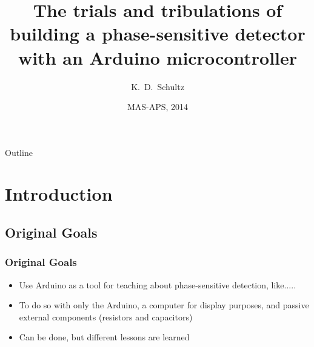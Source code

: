 \documentclass{beamer}
\title[PSD with Arduino CC-BY-SA.4.0] %
{The trials and tribulations of building a phase-sensitive detector with an Arduino microcontroller}
\author[K.\ D.\ Schultz] %
{K.~D.~Schultz}
\institute[Hartwick College] %
{
 
  Department of Physics\\
  Hartwick College
}
\date[MAS-APS] %
{MAS-APS, 2014}
\begin{document}
\begin{frame}
  \titlepage
\end{frame}

\begin{frame}{Outline}
  \tableofcontents
\end{frame}





\section {Introduction}

\subsection{Original Goals}

\begin{frame}
\frametitle{Original Goals}

\begin{itemize}[<+->]
\item {Use Arduino as a tool for teaching about phase-sensitive detection, like.....}
\item{To do so with only the Arduino, a computer for display purposes, and passive external components (resistors and capacitors)}
\pause
\item {Can be done, but different lessons are learned}
\end{itemize}
\end{frame}
\end{document}
